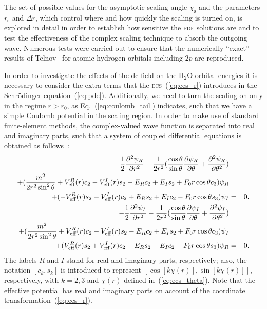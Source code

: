 The set of possible values for the asymptotic scaling angle
$\chi_{\mathrm{s}}$ and the parameters $r_{\mathrm{s}}$ and $\Delta
r$, which control where and how quickly the scaling is turned on, is
explored in detail in order to establish how sensitive the
\textsc{pde} solutions are and to test the effectiveness of the
complex scaling technique to absorb the outgoing wave. Numerous tests
were carried out to ensure that the numerically ``exact'' results of
Telnov~\cite{Telnov_1989} for atomic hydrogen orbitals including $2p$
are reproduced.

In order to investigate the effects of the dc field on the H$_{2}$O
orbital energies it is necessary to consider the extra terms that the
\textsc{ecs}~(\ref{eq:ecs_r}) introduces in the Schr\"{o}dinger
equation~(\ref{eq:pde}). Additionally, we need to turn the scaling on
only in the regime $r > r_{0}$, as Eq.~(\ref{eq:coulomb_tail})
indicates, such that we have a simple Coulomb potential in the scaling
region. In order to make use of standard finite-element methods, the
complex-valued wave function is separated into real and imaginary
parts, such that a system of coupled differential equations is
obtained as follows~\cite{sarias_2016}:
%
\begin{eqnarray}
  -\frac{1}{2}\frac{\partial^{2}\psi_{R}}{\partial r^2}-\frac{1}{2r^2}
  (\frac{\cos\theta}{\sin\theta}\frac{\partial\psi_{R}}{\partial\theta}+
  \frac{\partial^{2}\psi_{R}}{\partial\theta^2}) \nonumber\\
  +(\frac{m^2}{2r^2\sin^2\theta}+V_{\rm{eff}}^{R}(r)c_{2}-V_{\rm{eff}}^{I}(r)s_{2}
  -E_{R}c_{2}+E_{I}s_{2}+
  F_{0}r\cos\theta c_{3})\psi_{R} \nonumber\\
  +(-V_{\rm{eff}}^{R}(r)s_{2}-V_{\rm{eff}}^{I}(r)c_{2}+E_{R}s_{2}+E_{I}c_{2}-F_{0}r\cos\theta
  s_{3})\psi_{I} & = & 0, \nonumber\\
  \vspace{1cm}
  -\frac{1}{2}\frac{\partial^{2}\psi_{I}}{\partial r^2}-\frac{1}{2r^2}
  (\frac{\cos\theta}{\sin\theta}\frac{\partial\psi_{I}}{\partial\theta}+
  \frac{\partial^{2}\psi_{I}}{\partial\theta^2}) \nonumber\\
  +(\frac{m^2}{2r^2\sin^2\theta}+V_{\rm{eff}}^{R}(r)c_{2}-V_{\rm{eff}}^{I}(r)s_{2}
  -E_{R}c_{2}+E_{I}s_{2}+
  F_{0}r\cos\theta c_{3})\psi_{I} \nonumber\\
  +(V_{\rm{eff}}^{R}(r)s_{2}+V_{\rm{eff}}^{I}(r)c_{2}-E_{R}s_{2}-E_{I}c_{2}+F_{0}r\cos\theta
  s_{3})\psi_{R} & = & 0.
\label{eq:pde_system}
\end{eqnarray}
%
The labels $R$ and $I$ stand for real and imaginary parts,
respectively; also, the notation $[c_{k},s_{k}]$ is introduced to
represent $[\cos[k\chi(r)], \sin[k\chi(r)]]$, respectively, with
$k=2,3$ and $\chi(r)$ defined in~(\ref{eq:ecs_theta}). Note that the
effective potential has real and imaginary parts on account of the
coordinate transformation~(\ref{eq:ecs_r}).
 
